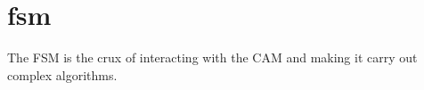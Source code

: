 \section{fsm}
The FSM is the crux of interacting with the CAM and making it carry out complex algorithms. 